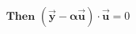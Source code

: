 \documentclass[preview]{standalone}
\begin{document}
\begin{align*}
\textbf{Then} \,\, ( \mathbf{\vec{y}} - \mathbf{\alpha} \mathbf{\vec{u}} ) \cdot \mathbf{\vec{u}} = 0
\end{align*}
\end{document}
